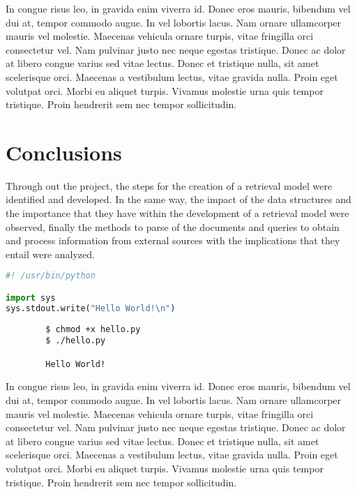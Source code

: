 \documentclass{article}
\begin{document}
\begin{question}
	In congue risus leo, in gravida enim viverra id. Donec eros mauris, bibendum vel dui at, tempor commodo augue. In vel lobortis lacus. Nam ornare ullamcorper mauris vel molestie. Maecenas vehicula ornare turpis, vitae fringilla orci consectetur vel. Nam pulvinar justo nec neque egestas tristique. Donec ac dolor at libero congue varius sed vitae lectus. Donec et tristique nulla, sit amet scelerisque orci. Maecenas a vestibulum lectus, vitae gravida nulla. Proin eget volutpat orci. Morbi eu aliquet turpis. Vivamus molestie urna quis tempor tristique. Proin hendrerit sem nec tempor sollicitudin.
\end{question}


\section{Conclusions}

Through out the project, the steps for the creation of a retrieval model were identified and developed. In the same way, the impact of the data structures and the importance that they have within the development of a retrieval model were observed, finally the methods to parse of the documents and queries to obtain and process information from external sources with the implications that they entail were analyzed.

\begin{file}[hello.py]
\begin{lstlisting}[language=Python]
#! /usr/bin/python

import sys
sys.stdout.write("Hello World!\n")
\end{lstlisting}
\end{file}

\begin{commandline}
	\begin{verbatim}
		$ chmod +x hello.py
		$ ./hello.py

		Hello World!
	\end{verbatim}
\end{commandline}

\begin{warn}[Notice:]
  In congue risus leo, in gravida enim viverra id. Donec eros mauris, bibendum vel dui at, tempor commodo augue. In vel lobortis lacus. Nam ornare ullamcorper mauris vel molestie. Maecenas vehicula ornare turpis, vitae fringilla orci consectetur vel. Nam pulvinar justo nec neque egestas tristique. Donec ac dolor at libero congue varius sed vitae lectus. Donec et tristique nulla, sit amet scelerisque orci. Maecenas a vestibulum lectus, vitae gravida nulla. Proin eget volutpat orci. Morbi eu aliquet turpis. Vivamus molestie urna quis tempor tristique. Proin hendrerit sem nec tempor sollicitudin.
\end{warn}

\end{document}
